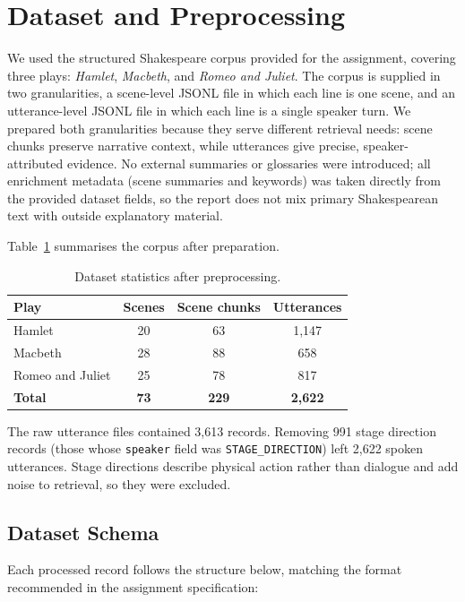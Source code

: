 \section{Dataset and Preprocessing}
\label{sec:dataset}

We used the structured Shakespeare corpus provided for the assignment,
covering three plays: \emph{Hamlet}, \emph{Macbeth}, and \emph{Romeo and
Juliet}. The corpus is supplied in two granularities, a scene-level JSONL
file in which each line is one scene, and an utterance-level JSONL file in
which each line is a single speaker turn. We prepared both granularities
because they serve different retrieval needs: scene chunks preserve
narrative context, while utterances give precise, speaker-attributed
evidence. No external summaries or glossaries were introduced; all
enrichment metadata (scene summaries and keywords) was taken directly
from the provided dataset fields, so the report does not mix primary
Shakespearean text with outside explanatory material.

Table~\ref{tab:dataset-stats} summarises the corpus after preparation.

\begin{table}[ht]
\centering
\caption{Dataset statistics after preprocessing.}
\label{tab:dataset-stats}
\begin{tabular}{lccc}
\toprule
Play & Scenes & Scene chunks & Utterances \\
\midrule
Hamlet           & 20 & 63  & 1{,}147 \\
Macbeth          & 28 & 88  & 658   \\
Romeo and Juliet & 25 & 78  & 817   \\
\midrule
\textbf{Total}   & \textbf{73} & \textbf{229} & \textbf{2{,}622} \\
\bottomrule
\end{tabular}
\end{table}

The raw utterance files contained 3{,}613 records. Removing 991 stage
direction records (those whose \texttt{speaker} field was
\texttt{STAGE\_DIRECTION}) left 2{,}622 spoken utterances. Stage
directions describe physical action rather than dialogue and add noise to
retrieval, so they were excluded.

\subsection{Dataset Schema}
Each processed record follows the structure below, matching the format
recommended in the assignment specification:

